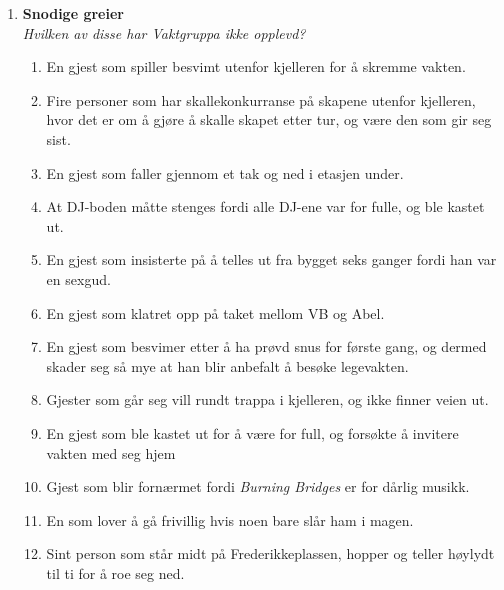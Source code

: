 \documentclass[11pt]{article}
\begin{document}
\begin{enumerate}
\begin{enumerate}
    \end{enumerate}

\item \textbf{Snodige greier} \vspace{1mm} \\
\textit{Hvilken av disse har Vaktgruppa ikke opplevd?}
    \begin{enumerate}
        \item En gjest som spiller besvimt utenfor kjelleren for å skremme vakten.
        \item Fire personer som har skallekonkurranse på skapene utenfor kjelleren, hvor det er om å gjøre å skalle skapet etter tur, og være den som gir seg sist.
        \item En gjest som faller gjennom et tak og ned i etasjen under.
        \item At DJ-boden måtte stenges fordi alle DJ-ene var for fulle, og ble kastet ut.
        \item En gjest som insisterte på å telles ut fra bygget seks ganger fordi han var en sexgud.
	\item En gjest som klatret opp på taket mellom VB og Abel.
	\item En gjest som besvimer etter å ha prøvd snus for første gang, og dermed skader seg så mye at han blir anbefalt å besøke legevakten.
	\item Gjester som går seg vill rundt trappa i kjelleren, og ikke finner veien ut.
	\item En gjest som ble kastet ut for å være for full, og forsøkte å invitere vakten med seg hjem
	\item Gjest som blir fornærmet fordi \textit{Burning Bridges} er for dårlig musikk.
        \item En som lover å gå frivillig hvis noen bare slår ham i magen.
        \item Sint person som står midt på Frederikkeplassen, hopper og teller høylydt til ti for å roe seg        ned.
    \end{enumerate}


\end{enumerate}
\end{document}
